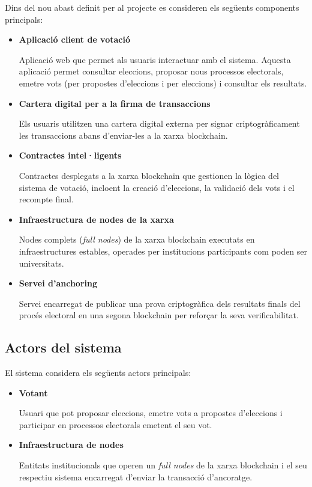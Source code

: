 \documentclass[12pt,a4paper]{article}
\begin{document}
Dins del nou abast definit per al projecte es consideren els següents components principals:

\begin{itemize}

\item \textbf{Aplicació client de votació}

Aplicació web que permet als usuaris interactuar amb el sistema. Aquesta aplicació permet consultar eleccions, proposar nous processos electorals, emetre vots (per propostes d'eleccions i per eleccions) i consultar els resultats.

\item \textbf{Cartera digital per a la firma de transaccions}

Els usuaris utilitzen una cartera digital externa per signar criptogràficament les transaccions abans d'enviar-les a la xarxa blockchain.

\item \textbf{Contractes intel·ligents}

Contractes desplegats a la xarxa blockchain que gestionen la lògica del sistema de votació, incloent la creació d'eleccions, la validació dels vots i el recompte final.

\item \textbf{Infraestructura de nodes de la xarxa}

Nodes complets (\textit{full nodes}) de la xarxa blockchain executats en infraestructures estables, operades per institucions participants com poden ser universitats.

\item \textbf{Servei d'anchoring}

Servei encarregat de publicar una prova criptogràfica dels resultats finals del procés electoral en una segona blockchain per reforçar la seva verificabilitat.

\end{itemize}

\subsection{Actors del sistema}

El sistema considera els següents actors principals:

\begin{itemize}

\item \textbf{Votant}

Usuari que pot proposar eleccions, emetre vots a propostes d'eleccions i participar en processos electorals emetent el seu vot.

\item \textbf{Infraestructura de nodes}

Entitats institucionals que operen un \textit{full nodes} de la xarxa blockchain i el seu respectiu sistema encarregat d'enviar la transacció d'ancoratge.

\end{itemize}
\end{document}
